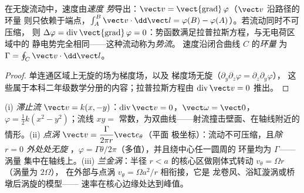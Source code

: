 \begin{definition}[速度势；环量]\label{def:b2:fluid-kinematics:potential}
在无旋流动中，速度由\emph{速度
势}导出：$\vect v = \operatorname{\vect{grad}}\varphi$（$\vect v$ 沿路径的环量
则只依赖于端点，$\int_A^B\vect v
\cdot\dd\vect l = \varphi(B) - \varphi(A)$）。若流动同时不可压缩，
则 $\Delta\varphi = \operatorname{div}\operatorname{\vect{grad}}
\varphi = 0$：势函数满足拉普拉斯方程，与无电荷区域中的
静电势完全相同——这种流动称为\emph{势流}。
速度沿闭合曲线 $C$ 的\emph{环量}
为 $\Gamma = \oint_C\vect v\cdot\dd\vect l$。
\end{definition}

\begin{proof}
单连通区域上无旋的场为梯度场，以及
梯度场无旋（$\partial_y\partial_z\varphi = \partial_z\partial_y\varphi$），
这些属于本科二年级数学分册的内容；拉普拉斯方程由
$\operatorname{div}\vect v = 0$ 推出。
\end{proof}

\begin{example}[三种平面流动]\label{ex:b2:fluid-kinematics:planeflows}
(i) \emph{滞止流} $\vect v = k(x, -y)$：$\operatorname{div}\vect v =
0$，$\vect\omega = \vect 0$，$\varphi = \tfrac12k(x^2 - y^2)$；流线
$xy = $ 常数，为双曲线——射流撞击壁面、在轴线附近的情形。(ii)
\emph{点涡} $\vect v = \dfrac{\Gamma}{2\pi r}\vect e_\theta$（平面
极坐标）：流动不可压缩，且\emph{除 $r = 0$ 外处处无旋}
，$\varphi = \Gamma\theta/2\pi$（多值），并且绕中心任一圆周的
环量均为 $\Gamma$——涡量
集中在轴线上。(iii) \emph{兰金涡}：半径
$r < a$ 的核心区做刚体式转动 $v_\theta = \Omega r$（涡量为 $2\Omega$），
在外部与点涡 $v_\theta = \Omega a^2/r$ 相衔接，它是
龙卷风、浴缸漩涡或桥墩后涡旋的模型——
速率在核心边缘处达到峰值。
\end{example}

